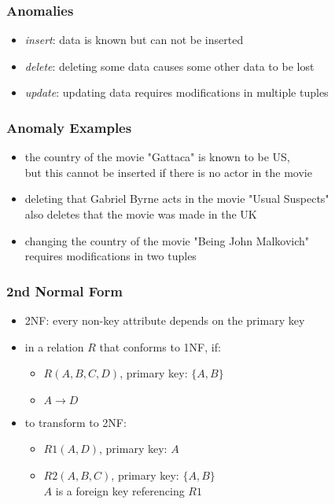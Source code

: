 \documentclass[dvipsnames]{beamer}
\begin{document}
\begin{frame}
  \frametitle{Anomalies}

  \begin{itemize}
    \item \emph{insert}: data is known but can not be inserted

    \medskip
    \item \emph{delete}: deleting some data causes some other data to be lost

    \medskip
    \item \emph{update}: updating data requires modifications in multiple tuples
  \end{itemize}
\end{frame}

\begin{frame}
  \frametitle{Anomaly Examples}

  \begin{itemize}
    \item the country of the movie "Gattaca" is known to be US,\\
      but this cannot be inserted if there is no actor in the movie

    \pause
    \medskip
    \item deleting that Gabriel Byrne acts in the movie "Usual Suspects"\\
      also deletes that the movie was made in the UK

    \pause
    \medskip
    \item changing the country of the movie "Being John Malkovich"\\
      requires modifications in two tuples
  \end{itemize}
\end{frame}

\begin{frame}
  \frametitle{2nd Normal Form}

  \begin{itemize}
    \item \alert{2NF}: every non-key attribute depends on the primary key

    \pause
    \medskip
    \item in a relation $R$ that conforms to 1NF, if:
    \begin{itemize}
      \item $R(A,B,C,D)$, primary key: $\{A,B\}$
      \item $A \rightarrow D$
    \end{itemize}

    \medskip
    \item to transform to 2NF:
    \begin{itemize}
      \item $R1(A,D)$, primary key: $A$
      \item $R2(A,B,C)$, primary key: $\{A,B\}$\\
        $A$ is a foreign key referencing $R1$
    \end{itemize}
  \end{itemize}
\end{frame}
\end{document}
